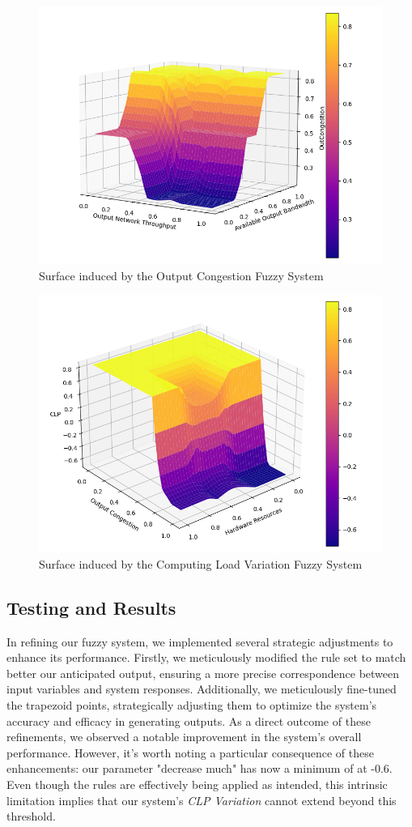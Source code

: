 \begin{figure}[!htb]
    \centering
    
    \includegraphics[width=.6\textwidth]{images/plots/OutCongestion3D.png}\hfill
    
    \caption{Surface induced by the  Output Congestion Fuzzy System}
    \label{fig:FS_OutCongestion_OUT}
\end{figure}

\begin{figure}[!htb]
    \centering
    
    \includegraphics[width=.6\textwidth]{images/plots/CLP3D_better.png}\hfill
    
    \caption{Surface induced by the Computing Load Variation Fuzzy System}
    \label{fig:FS_CLP_OUT}
\end{figure}


\subsection{Testing and Results}

In refining our fuzzy system, we implemented several strategic adjustments to enhance its performance. Firstly, we meticulously modified the rule set to match better our anticipated output, ensuring a more precise correspondence between input variables and system responses. Additionally, we meticulously fine-tuned the trapezoid points, strategically adjusting them to optimize the system's accuracy and efficacy in generating outputs. As a direct outcome of these refinements, we observed a notable improvement in the system's overall performance. However, it's worth noting a particular consequence of these enhancements: our parameter "decrease much" has now a minimum of at -0.6. Even though the rules are effectively being applied as intended, this intrinsic limitation implies that our system's \textit{CLP Variation} cannot extend beyond this threshold.

